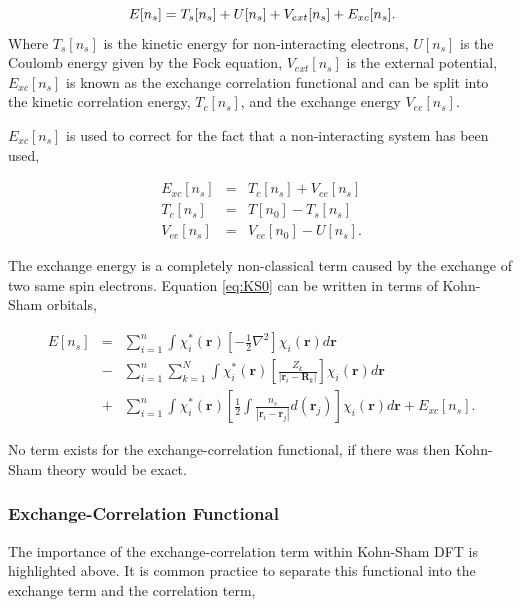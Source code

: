 \begin{equation} \label{eq:KS0}
\ E[n_s] = T_s[n_s] + U[n_s] + V_{ext}[n_s] + E_{xc}[n_s] \\.
\end{equation}
%
Where $T_s[n_s]$ is the kinetic energy for non-interacting electrons, $U[n_s]$ is the Coulomb energy given by the Fock equation, $V_{ext}[n_s]$ is the external potential, $E_{xc}[n_s]$ is known as the exchange correlation functional and can be split into the kinetic correlation energy, $T_c[n_s]$, and the exchange energy $V_{ee}[n_s]$.

$E_{xc}[n_s]$ is used to correct for the fact that a non-interacting system has been used,

\begin{eqnarray}
\ E_{xc}[n_s] &=& T_c[n_s] + V_{ee}[n_s] \\
\ T_c[n_s] &=& T[n_0] - T_s[n_s] \\
\ V_{ee}[n_s] &=& V_{ee}[n_0] - U[n_s] \label{eq:KS1} .
\end{eqnarray}

The exchange energy is a completely non-classical term caused by the exchange of two same spin electrons.  Equation \ref{eq:KS0} can be written in terms of Kohn-Sham orbitals,

\begin{eqnarray}
\ E[n_s] &=& \sum_{i=1}^{n} 
\int \chi_{i}^{*}(\mathbf{r}) \left[ - \frac{1}{2} \nabla^2 \right] \chi_{i}(\mathbf{r}) d \mathbf{r} \nonumber \\
 &-& \sum_{i=1}^{n} \sum_{k=1}^{N} \int  \chi_{i}^{*}(\mathbf{r}) \left[ \frac{Z_k}{|\mathbf{r}_i - \mathbf{R}_k |}  \right] \chi_{i}(\mathbf{r}) d \mathbf{r} \nonumber \\
  &+& \sum_{i=1}^{n} \int \chi_{i}^{*}(\mathbf{r}) \left[ \frac{1}{2} \int \frac{n_s}{| \mathbf{r}_i - \mathbf{r}_j | }d(\mathbf{r}_j) \right] \chi_{i}(\mathbf{r}) d \mathbf{r} + E_{xc}[n_s] . \label{eq:KS2}
\end{eqnarray}

No term exists for the exchange-correlation functional, if there was then Kohn-Sham theory would be exact. 

\subsubsection{Exchange-Correlation Functional}

The importance of the exchange-correlation term within Kohn-Sham DFT is highlighted above.  It is common practice to separate this functional into the exchange term and the correlation term,

